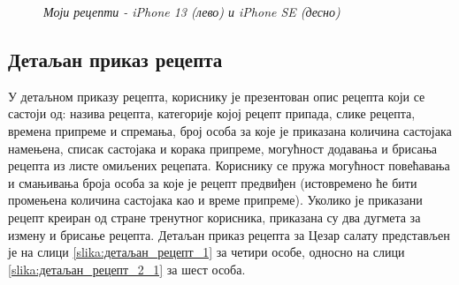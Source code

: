 \documentclass[12pt,oneside]{memoir}
\begin{document}
\begin{figure} [H]
    \caption{\textit{Моји рецепти - iPhone 13 (лево) и iPhone SE (десно)}}
    \label{slika:моји_рецепти_1}
\end{figure}

\subsection{Детаљан приказ рецепта}

\indent У детаљном приказу рецепта, кориснику је презентован опис рецепта који се састоји од: назива рецепта, категорије којој рецепт припада, слике рецепта, времена припреме и спремања, број особа за које је приказана количина састојака намењена, списак састојака и корака припреме, могућност додавања и брисања рецепта из листе омиљених рецепата. Кориснику се пружа могућност повећавања и смањивања броја особа за које је рецепт предвиђен (истовремено ће бити промењена количина састојака као и време припреме). Уколико је приказани рецепт креиран од стране тренутног корисника, приказана су два дугмета за измену и брисање рецепта. Детаљан приказ рецепта за Цезар салату представљен је на слици \ref{slika:детаљан_рецепт_1} за четири особе, односно на слици \ref{slika:детаљан_рецепт_2_1} за шест особа.
\end{document}
